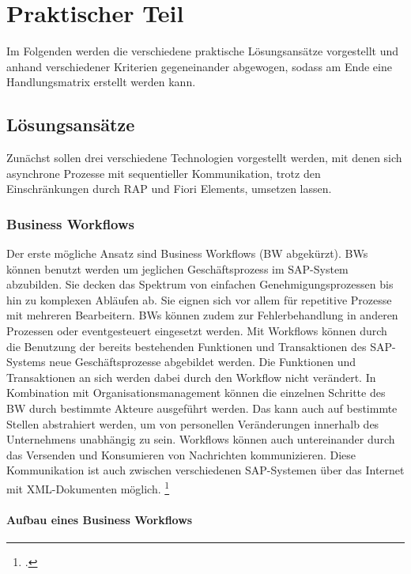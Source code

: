 \chapter{Praktischer Teil}

Im Folgenden werden die verschiedene praktische Lösungsansätze vorgestellt und anhand verschiedener Kriterien gegeneinander abgewogen, sodass am Ende eine Handlungsmatrix erstellt werden kann.

\section{Lösungsansätze}

Zunächst sollen drei verschiedene Technologien vorgestellt werden, mit denen sich asynchrone Prozesse mit sequentieller Kommunikation, trotz den Einschränkungen durch RAP und Fiori Elements, umsetzen lassen.

\subsection{Business Workflows}

Der erste mögliche Ansatz sind Business Workflows (BW abgekürzt). BWs können benutzt werden um jeglichen Geschäftsprozess im SAP-System abzubilden. Sie decken das Spektrum von einfachen Genehmigungsprozessen bis hin zu komplexen Abläufen ab. Sie eignen sich vor allem für repetitive Prozesse mit mehreren Bearbeitern. BWs können zudem zur Fehlerbehandlung in anderen Prozessen oder eventgesteuert eingesetzt werden. Mit Workflows können durch die Benutzung der bereits bestehenden Funktionen und Transaktionen des SAP-Systems neue Geschäftsprozesse abgebildet werden. Die Funktionen und Transaktionen an sich werden dabei durch den Workflow nicht verändert. In Kombination mit Organisationsmanagement können die einzelnen Schritte des BW durch bestimmte Akteure ausgeführt werden. Das kann auch auf bestimmte Stellen abstrahiert werden, um von personellen Veränderungen innerhalb des Unternehmens unabhängig zu sein. Workflows können auch untereinander durch das Versenden und Konsumieren von Nachrichten kommunizieren. Diese Kommunikation ist auch zwischen verschiedenen SAP-Systemen über das Internet mit XML-Dokumenten möglich. \footcite[Vgl.][]{sap_business-workflows_2022-1}

\subsubsection{Aufbau eines Business Workflows}

